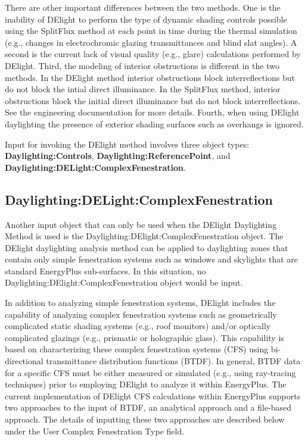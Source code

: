There are other important differences between the two methods. One is the inability of DElight to perform the type of dynamic shading controls possible using the SplitFlux method at each point in time during the thermal simulation (e.g., changes in electrochromic glazing transmittances and blind slat angles).  A second is the current lack of visual quality (e.g., glare) calculations performed by DElight. Third, the modeling of interior obstructions is different in the two methods. In the DElight method interior obstructions block interreflections but do not block the intial direct illuminance. In the SplitFlux method, interior obstructions block the initial direct illuminance but do not block interreflections. See the engineering documentation for more details. Fourth, when using DElight daylighting the presence of exterior shading surfaces such as overhangs is ignored.

Input for invoking the DElight method involves three object types: \textbf{Daylighting:Controls}, \textbf{Daylighting:ReferencePoint}, and \textbf{Daylighting:DELight:ComplexFenestration}.


\subsection{Daylighting:DELight:ComplexFenestration}\label{daylightingdelightcomplexfenestration}

Another input object that can only be used when the DElight Daylighting Method is used is  the Daylighting:DElight:ComplexFenestration object. The DElight daylighting analysis method can be applied to daylighting zones that contain only simple fenestration systems such as windows and skylights that are standard EnergyPlus sub-surfaces. In this situation, no Daylighting:DElight:ComplexFenestration object would be input.

In addition to analyzing simple fenestration systems, DElight includes the capability of analyzing complex fenestration systems such as geometrically complicated static shading systems (e.g., roof monitors) and/or optically complicated glazings (e.g., prismatic or holographic glass). This capability is based on characterizing these complex fenestration systems (CFS) using bi-directional transmittance distribution functions (BTDF). In general, BTDF data for a specific CFS must be either measured or simulated (e.g., using ray-tracing techniques) prior to employing DElight to analyze it within EnergyPlus. The current implementation of DElight CFS calculations within EnergyPlus supports two approaches to the input of BTDF, an analytical approach and a file-based approach. The details of inputting these two approaches are described below under the User Complex Fenestration Type field.

